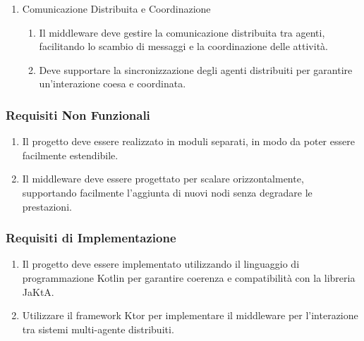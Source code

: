 \begin{enumerate}
      \item  Comunicazione Distribuita e Coordinazione
            \begin{enumerate}
                  \item  Il middleware deve gestire la comunicazione distribuita tra agenti, facilitando
                        lo scambio di messaggi e la coordinazione delle attività.
                  \item Deve supportare la sincronizzazione degli agenti distribuiti per garantire
                        un'interazione coesa e coordinata.
            \end{enumerate}
\end{enumerate}

\subsubsection{Requisiti Non Funzionali}

\begin{enumerate}
      \item Il progetto deve essere realizzato in moduli separati, in modo da poter essere facilmente estendibile.
      \item  Il middleware deve essere progettato per scalare orizzontalmente, supportando facilmente l'aggiunta di nuovi nodi senza degradare le prestazioni.
\end{enumerate}

\subsubsection{Requisiti di Implementazione}

\begin{enumerate}
      \item  Il progetto deve essere implementato utilizzando il linguaggio di programmazione
            Kotlin per garantire coerenza e compatibilità con la libreria JaKtA.
      \item Utilizzare il framework Ktor per implementare il middleware per l'interazione tra
            sistemi multi-agente distribuiti.
\end{enumerate}


